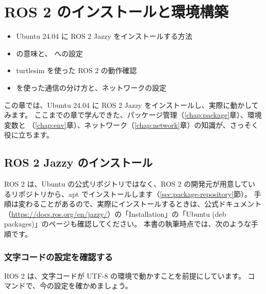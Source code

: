 \chapter{ROS 2 のインストールと環境構築}
\label{chap:ros2_install}

\begin{goalbox}
  \begin{itemize}
    \item Ubuntu 24.04 に ROS 2 Jazzy をインストールする方法
    \item {} の意味と、 への設定
    \item turtlesim を使った ROS 2 の動作確認
    \item {} を使った通信の分け方と、ネットワークの設定
  \end{itemize}
\end{goalbox}

この章では、Ubuntu 24.04 に ROS 2 Jazzy をインストールし、実際に動かしてみます。
ここまでの章で学んできた、パッケージ管理（\ref{chap:package}章）、環境変数と （\ref{chap:env}章）、ネットワーク（\ref{chap:network}章）の知識が、さっそく役に立ちます。

\section{ROS 2 Jazzy のインストール}
\label{sec:ros2-install-install}

ROS 2 は、Ubuntu の公式リポジトリではなく、ROS 2 の開発元が用意しているリポジトリから、apt でインストールします（\ref{sec:package-repository}節）。
手順は変わることがあるので、実際にインストールするときは、公式ドキュメント（\url{https://docs.ros.org/en/jazzy/}）の「Installation」の「Ubuntu (deb packages)」のページも確認してください。
本書の執筆時点では、次のような手順です。

\subsection{文字コードの設定を確認する}

ROS 2 は、文字コードが UTF-8 の環境で動かすことを前提にしています。
 コマンドで、今の設定を確かめましょう。


